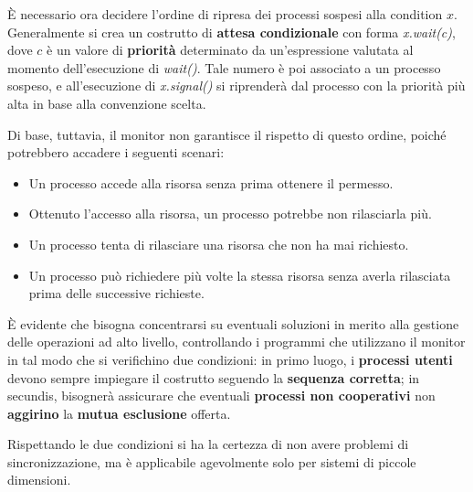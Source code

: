 \noindent È necessario ora decidere l'ordine di ripresa dei processi sospesi alla condition $x$. Generalmente si crea un costrutto di
\textbf{attesa condizionale} con forma \textit{x.wait(c)}, dove $c$ è un valore di \textbf{priorità} determinato da un'espressione valutata al momento
dell'esecuzione di \textit{wait()}. Tale numero è poi associato a un processo sospeso, e all'esecuzione di \textit{x.signal()} si riprenderà dal
processo con la priorità più alta in base alla convenzione scelta.\par
Di base, tuttavia, il monitor non garantisce il rispetto di questo ordine, poiché potrebbero accadere i seguenti scenari: \begin{itemize}
    \item Un processo accede alla risorsa senza prima ottenere il permesso.
    \item Ottenuto l'accesso alla risorsa, un processo potrebbe non rilasciarla più.
    \item Un processo tenta di rilasciare una risorsa che non ha mai richiesto.
    \item Un processo può richiedere più volte la stessa risorsa senza averla rilasciata prima delle successive richieste.
\end{itemize}

\noindent È evidente che bisogna concentrarsi su eventuali soluzioni in merito alla gestione delle operazioni ad alto livello, controllando i programmi
che utilizzano il monitor in tal modo che si verifichino due condizioni: in primo luogo, i \textbf{processi utenti} devono sempre impiegare il costrutto
seguendo la \textbf{sequenza corretta}; in secundis, bisognerà assicurare che eventuali \textbf{processi non cooperativi} non \textbf{aggirino} la
\textbf{mutua esclusione} offerta.\par
Rispettando le due condizioni si ha la certezza di non avere problemi di sincronizzazione, ma è applicabile agevolmente solo per sistemi di piccole
dimensioni.

%


